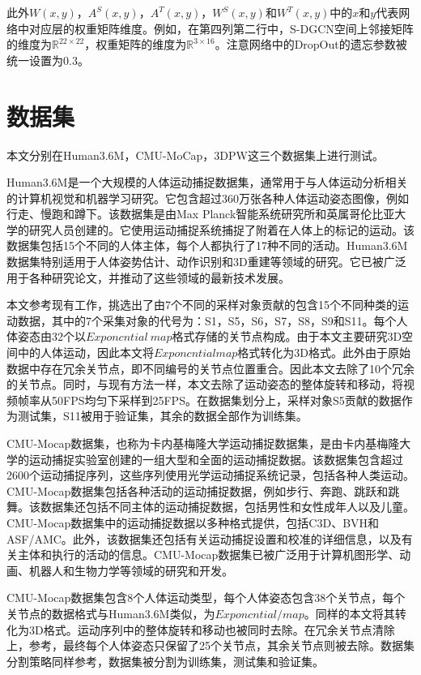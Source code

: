 此外$W(x,y)$，$A^S(x,y)$，$A^T(x,y)$，$W^S(x,y)$和$W^T(x,y)$中的$x$和$y$代表网络中对应层的权重矩阵维度。例如，在第四列第二行中，S-DGCN空间上邻接矩阵的维度为$\mathbb{R}^{22 \times 22}$，权重矩阵的维度为$\mathbb{R}^{3 \times 16}$。注意网络中的DropOut的遗忘参数被统一设置为0.3。


\section{数据集}
本文分别在Human3.6M\parencite{ionescu2013human3}，CMU-MoCap，3DPW\parencite{von2018recovering}这三个数据集上进行测试。

Human3.6M是一个大规模的人体运动捕捉数据集，通常用于与人体运动分析相关的计算机视觉和机器学习研究。它包含超过360万张各种人体运动姿态图像，例如行走、慢跑和蹲下。该数据集是由Max Planck智能系统研究所和英属哥伦比亚大学的研究人员创建的。它使用运动捕捉系统捕捉了附着在人体上的标记的运动。该数据集包括15个不同的人体主体，每个人都执行了17种不同的活动。Human3.6M数据集特别适用于人体姿势估计、动作识别和3D重建等领域的研究。它已被广泛用于各种研究论文，并推动了这些领域的最新技术发展。

本文参考现有工作，挑选出了由7个不同的采样对象贡献的包含15个不同种类的运动数据，其中的7个采集对象的代号为：S1，S5，S6，S7，S8，S9和S11。每个人体姿态由32个以$Exponcntial \ map$格式存储的关节点构成。由于本文主要研究3D空间中的人体运动，因此本文将$Exponcntial map$格式转化为3D格式。此外由于原始数据中存在冗余关节点，即不同编号的关节点位置重合。因此本文去除了10个冗余的关节点。同时，与现有方法一样，本文去除了运动姿态的整体旋转和移动，将视频帧率从50FPS均匀下采样到25FPS。在数据集划分上，采样对象S5贡献的数据作为测试集，S11被用于验证集，其余的数据全部作为训练集。

CMU-Mocap数据集，也称为卡内基梅隆大学运动捕捉数据集，是由卡内基梅隆大学的运动捕捉实验室创建的一组大型和全面的运动捕捉数据。该数据集包含超过2600个运动捕捉序列，这些序列使用光学运动捕捉系统记录，包括各种人类运动。CMU-Mocap数据集包括各种活动的运动捕捉数据，例如步行、奔跑、跳跃和跳舞。该数据集还包括不同主体的运动捕捉数据，包括男性和女性成年人以及儿童。CMU-Mocap数据集中的运动捕捉数据以多种格式提供，包括C3D、BVH和ASF/AMC。此外，该数据集还包括有关运动捕捉设置和校准的详细信息，以及有关主体和执行的活动的信息。CMU-Mocap数据集已被广泛用于计算机图形学、动画、机器人和生物力学等领域的研究和开发。

CMU-Mocap数据集包含8个人体运动类型，每个人体姿态包含38个关节点，每个关节点的数据格式与Human3.6M类似，为$Exponcntial / map$。同样的本文将其转化为3D格式。运动序列中的整体旋转和移动也被同时去除。在冗余关节点清除上，参考\parencite{dang2021msr,mao2019learning}，最终每个人体姿态只保留了25个关节点，其余关节点则被去除。数据集分割策略同样参考\parencite{dang2021msr,mao2019learning}，数据集被分割为训练集，测试集和验证集。

